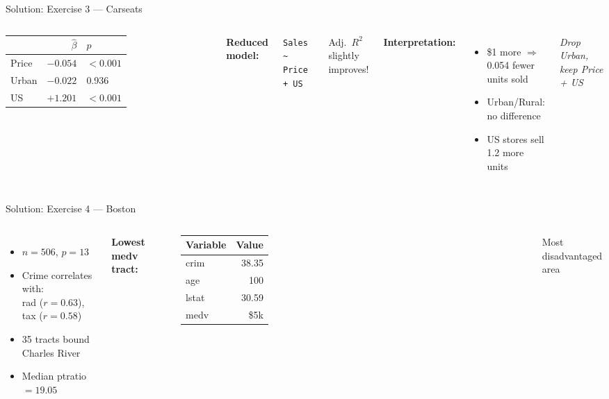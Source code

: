 \documentclass[aspectratio=169, 11pt]{beamer}
\begin{document}
\begin{frame}{Solution: Exercise 3 --- Carseats}

\begin{columns}
\begin{tabular}{lrl}
\toprule
 & $\hat{\beta}$ & $p$ \\
\midrule
Price & $-0.054$ & $< 0.001$ \\
Urban & $-0.022$ & \textcolor{softred}{0.936} \\
US & $+1.201$ & $< 0.001$ \\
\bottomrule
\end{tabular}

\vspace{0.5em}
\textbf{Reduced model:}

\texttt{Sales \textasciitilde{} Price + US}

\vspace{0.3em}
Adj.\ $R^2$ slightly improves!

\textbf{Interpretation:}

\begin{itemize}
  \item \$1 more $\Rightarrow$ 0.054 fewer units sold
  \item Urban/Rural: no difference
  \item US stores sell 1.2 more units
\end{itemize}

\vspace{0.3em}
\textcolor{accent}{\textit{Drop Urban, keep Price + US}}
\end{columns}
\end{frame}


\begin{frame}{Solution: Exercise 4 --- Boston}
\begin{columns}
\begin{itemize}
  \item $n = 506$, $p = 13$
  \item Crime correlates with:\\rad ($r=0.63$), tax ($r=0.58$)
  \item 35 tracts bound Charles River
  \item Median ptratio $= 19.05$
\end{itemize}

\textbf{Lowest medv tract:}

\begin{tabular}{lr}
\toprule
Variable & Value \\
\midrule
crim & 38.35 \\
age & 100 \\
lstat & 30.59 \\
medv & \$5k \\
\bottomrule
\end{tabular}

\vspace{0.2em}
\footnotesize Most disadvantaged area
\end{columns}
\end{frame}
\end{document}
